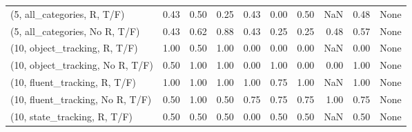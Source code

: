 \begin{table*}[h!]
\begin{adjustbox}{width=2\columnwidth,center}
\begin{tabular}{lrrr|rrr|rrr}
(5, all\_categories, R, T/F)          &                      0.43 &                  0.50 &                      0.25 &                          0.43 &                      0.00 &                          0.50 &                                    NaN &                               0.48 &                                  None \\
(5, all\_categories, No R, T/F)       &                      0.43 &                  0.62 &                      0.88 &                          0.43 &                      0.25 &                          0.25 &                                   0.48 &                               0.57 &                                  None \\



\midrule
(10, object\_tracking, R, T/F)         &                      1.00 &                  0.50 &                      1.00 &                          0.00 &                      0.00 &                          0.00 &                                    NaN &                               0.00 &                                  None \\
(10, object\_tracking, No R, T/F)      &                      0.50 &                  1.00 &                      1.00 &                          0.00 &                      1.00 &                          0.00 &                                   0.00 &                               1.00 &                                  None \\
(10, fluent\_tracking, R, T/F)         &                      1.00 &                  1.00 &                      1.00 &                          1.00 &                      0.75 &                          1.00 &                                    NaN &                               1.00 &                                  None \\
(10, fluent\_tracking, No R, T/F)      &                      0.50 &                  1.00 &                      0.50 &                          0.75 &                      0.75 &                          0.75 &                                   1.00 &                               0.75 &                                  None \\
(10, state\_tracking, R, T/F)          &                      0.50 &                  0.50 &                      0.50 &                          0.00 &                      0.50 &                          0.50 &                                    NaN &                               0.50 &                                  None \\

\end{tabular}
\end{adjustbox}
\end{table*}
